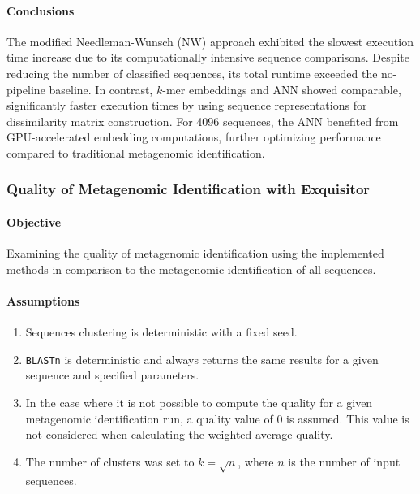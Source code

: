 \documentclass[biomedinformatics,article,submit,moreauthors]{Definitions/mdpi}
\begin{document}
                \paragraph{Conclusions}
                The modified Needleman-Wunsch (NW) approach exhibited the slowest execution time increase due to its computationally intensive sequence comparisons. Despite reducing the number of classified sequences, its total runtime exceeded the no-pipeline baseline. In contrast, $k$-mer embeddings and ANN showed comparable, significantly faster execution times by using sequence representations for dissimilarity matrix construction. For 4096 sequences, the ANN benefited from GPU-accelerated embedding computations, further optimizing performance compared to traditional metagenomic identification.

            \subsubsection{Quality of Metagenomic Identification with Exquisitor}
                \paragraph{Objective}
                Examining the quality of metagenomic identification using the implemented methods in comparison to the metagenomic identification of all sequences.

                \paragraph{Assumptions}
                \begin{enumerate}
                    \item {
                        Sequences clustering is deterministic with a fixed seed.
                    }
                    \item {
                        \texttt{BLASTn} is deterministic and always returns the same results for a given sequence and specified parameters.
                    }
                    \item {
                        In the case where it is not possible to compute the quality for a given metagenomic identification run, a quality value of $0$ is assumed. This value is not considered when calculating the weighted average quality.
                    }
                    \item {
                        The number of clusters was set to $k = \sqrt{n}$, where $n$ is the number of input sequences.
                    }
                  \end{enumerate}
\end{document}
